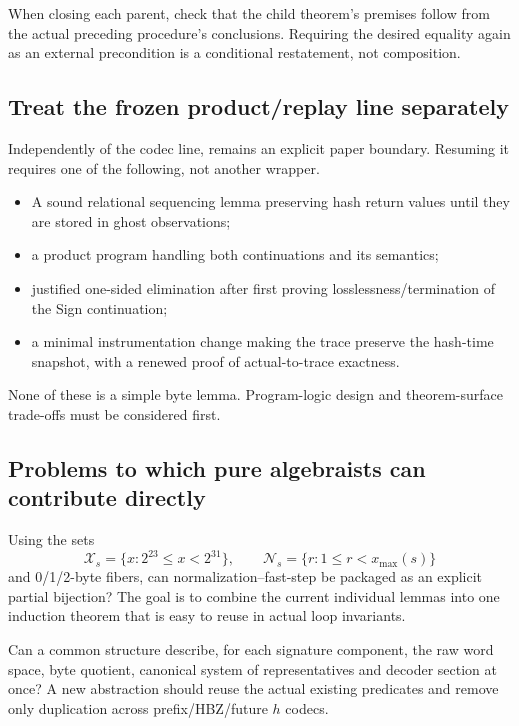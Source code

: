 When closing each parent, check that the child theorem's premises follow from
the actual preceding procedure's conclusions. Requiring the desired equality
again as an external precondition is a conditional restatement, not composition.

\subsection{Treat the frozen product/replay line separately}

Independently of the codec line,  remains an
explicit paper boundary. Resuming it requires one of the following, not another
wrapper.

\begin{itemize}
  \item A sound relational sequencing lemma preserving hash return values until
        they are stored in ghost observations;
  \item a product program handling both continuations and its semantics;
  \item justified one-sided elimination after first proving losslessness/termination
        of the Sign continuation;
  \item a minimal instrumentation change making the trace preserve the hash-time
        snapshot, with a renewed proof of actual-to-trace exactness.
\end{itemize}

None of these is a simple byte lemma. Program-logic design and theorem-surface
trade-offs must be considered first.

\subsection{Problems to which pure algebraists can contribute directly}

\begin{question}
Using the sets
\[
  \mathcal X_s=\{x:2^{23}\le x<2^{31}\},\qquad
  \mathcal N_s=\{r:1\le r<x_{\max}(s)\}
\]
and 0/1/2-byte fibers, can normalization--fast-step be packaged as an explicit
partial bijection? The goal is to combine the current individual lemmas into
one induction theorem that is easy to reuse in actual loop invariants.
\end{question}

\begin{question}
Can a common structure describe, for each signature component, the raw word
space, byte quotient, canonical system of representatives and decoder section
at once? A new abstraction should reuse the actual existing predicates and
remove only duplication across prefix/HBZ/future \(h\) codecs.
\end{question}

